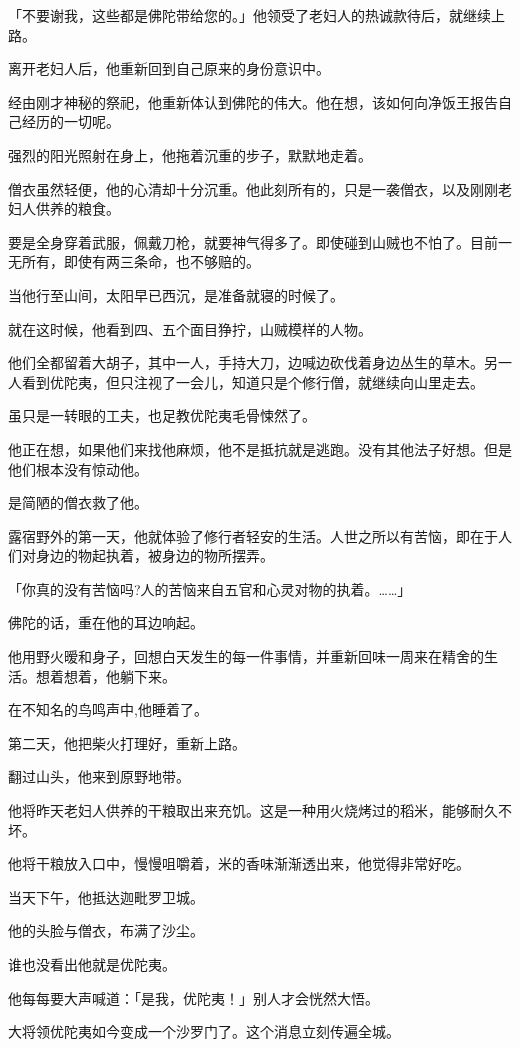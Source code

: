 \documentclass[twoside,openany]{book}
\begin{document}
「不要谢我，这些都是佛陀带给您的。」他领受了老妇人的热诚款待后，就继续上路。

离开老妇人后，他重新回到自己原来的身份意识中。

经由刚才神秘的祭祀，他重新体认到佛陀的伟大。他在想，该如何向净饭王报告自己经历的一切呢。

强烈的阳光照射在身上，他拖着沉重的步子，默默地走着。

僧衣虽然轻便，他的心清却十分沉重。他此刻所有的，只是一袭僧衣，以及刚刚老妇人供养的粮食。

要是全身穿着武服，佩戴刀枪，就要神气得多了。即使碰到山贼也不怕了。目前一无所有，即使有两三条命，也不够赔的。

当他行至山间，太阳早已西沉，是准备就寝的时候了。

就在这时候，他看到四、五个面目狰拧，山贼模样的人物。

他们全都留着大胡子，其中一人，手持大刀，边喊边砍伐着身边丛生的草木。另一人看到优陀夷，但只注视了一会儿，知道只是个修行僧，就继续向山里走去。

虽只是一转眼的工夫，也足教优陀夷毛骨悚然了。

他正在想，如果他们来找他麻烦，他不是抵抗就是逃跑。没有其他法子好想。但是他们根本没有惊动他。

是简陋的僧衣救了他。

露宿野外的第一天，他就体验了修行者轻安的生活。人世之所以有苦恼，即在于人们对身边的物起执着，被身边的物所摆弄。

「你真的没有苦恼吗?人的苦恼来自五官和心灵对物的执着。……」

佛陀的话，重在他的耳边响起。

他用野火暧和身子，回想白天发生的每一件事情，并重新回味一周来在精舍的生活。想着想着，他躺下来。

在不知名的鸟鸣声中,他睡着了。

第二天，他把柴火打理好，重新上路。

翻过山头，他来到原野地带。

他将昨天老妇人供养的干粮取出来充饥。这是一种用火烧烤过的稻米，能够耐久不坏。

他将干粮放入口中，慢慢咀嚼着，米的香味渐渐透出来，他觉得非常好吃。

当天下午，他抵达迦毗罗卫城。

他的头脸与僧衣，布满了沙尘。

谁也没看出他就是优陀夷。

他每每要大声喊道：「是我，优陀夷！」别人才会恍然大悟。

大将领优陀夷如今变成一个沙罗门了。这个消息立刻传遍全城。
\end{document}
